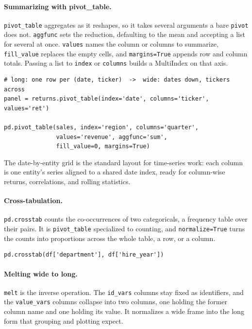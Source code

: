 \vspace{-2ex}

\paragraph{Summarizing with pivot\_table.} \texttt{pivot\_table} aggregates as it reshapes, so it takes several arguments a bare \texttt{pivot} does not. \texttt{aggfunc} sets the reduction, defaulting to the mean and accepting a list for several at once. \texttt{values} names the column or columns to summarize, \texttt{fill\_value} replaces the empty cells, and \texttt{margins=True} appends row and column totals. Passing a list to \texttt{index} or \texttt{columns} builds a MultiIndex on that axis.

\begin{lstlisting}[style=python, caption={A long panel to a date-by-entity grid, and a summary with totals}]
# long: one row per (date, ticker)  ->  wide: dates down, tickers across
panel = returns.pivot_table(index='date', columns='ticker', values='ret')

pd.pivot_table(sales, index='region', columns='quarter',
               values='revenue', aggfunc='sum',
               fill_value=0, margins=True)
\end{lstlisting}

\vspace{-1ex}

The date-by-entity grid is the standard layout for time-series work: each column is one entity's series aligned to a shared date index, ready for column-wise returns, correlations, and rolling statistics.

\paragraph{Cross-tabulation.} \texttt{pd.crosstab} counts the co-occurrences of two categoricals, a frequency table over their pairs. It is \texttt{pivot\_table} specialized to counting, and \texttt{normalize=True} turns the counts into proportions across the whole table, a row, or a column.

\begin{lstlisting}[style=python, caption={Frequency of department against hire year}]
pd.crosstab(df['department'], df['hire_year'])
\end{lstlisting}

\vspace{-1ex}

\paragraph{Melting wide to long.} \texttt{melt} is the inverse operation. The \texttt{id\_vars} columns stay fixed as identifiers, and the \texttt{value\_vars} columns collapse into two columns, one holding the former column name and one holding its value. It normalizes a wide frame into the long form that grouping and plotting expect.

